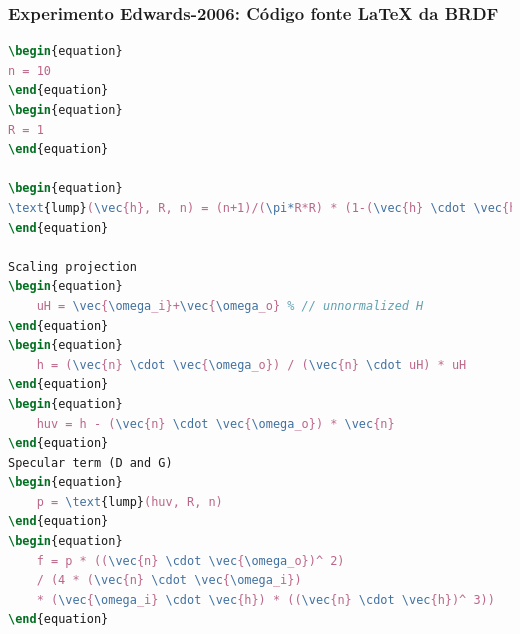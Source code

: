 \begin{frame}[fragile]
    \frametitle{Experimento Edwards-2006: Código fonte \LaTeX{} da BRDF}
    \vspace{-0.3cm}
    \hspace{2cm}
\begin{lstlisting}[basicstyle=\ttfamily\scriptsize,language=tex, frame=none, inputencoding=utf8]
\begin{equation}
n = 10
\end{equation}
\begin{equation}
R = 1
\end{equation}

\begin{equation}
\text{lump}(\vec{h}, R, n) = (n+1)/(\pi*R*R) * (1-(\vec{h} \cdot \vec{h})/(R*R)^ n)
\end{equation}

Scaling projection
\begin{equation}
    uH = \vec{\omega_i}+\vec{\omega_o} % // unnormalized H
\end{equation}
\begin{equation}
    h = (\vec{n} \cdot \vec{\omega_o}) / (\vec{n} \cdot uH) * uH
\end{equation}
\begin{equation}
    huv = h - (\vec{n} \cdot \vec{\omega_o}) * \vec{n}
\end{equation}
Specular term (D and G)
\begin{equation}
    p = \text{lump}(huv, R, n)
\end{equation}
\begin{equation}
    f = p * ((\vec{n} \cdot \vec{\omega_o})^ 2)
    / (4 * (\vec{n} \cdot \vec{\omega_i})
    * (\vec{\omega_i} \cdot \vec{h}) * ((\vec{n} \cdot \vec{h})^ 3))
\end{equation}
\end{lstlisting}
\end{frame}

